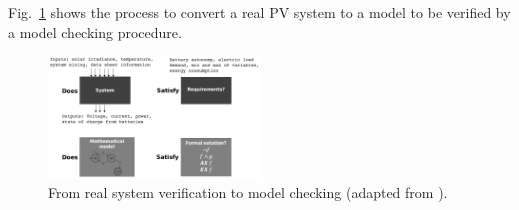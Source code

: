 \documentclass[journal]{IEEEtran}
\begin{document}
%
%
%
%
%
%
Fig.~\ref{fig:systemverif} shows the process to convert a real PV system to a model to be verified by a model checking procedure. %

\begin{figure}[h]
\includegraphics[width=0.5\textwidth]{systemverif2}
\centering
\caption{From real system verification to model checking (adapted from \cite{ClarkeHV18}).}
\label{fig:systemverif}
\end{figure}
\end{document}
